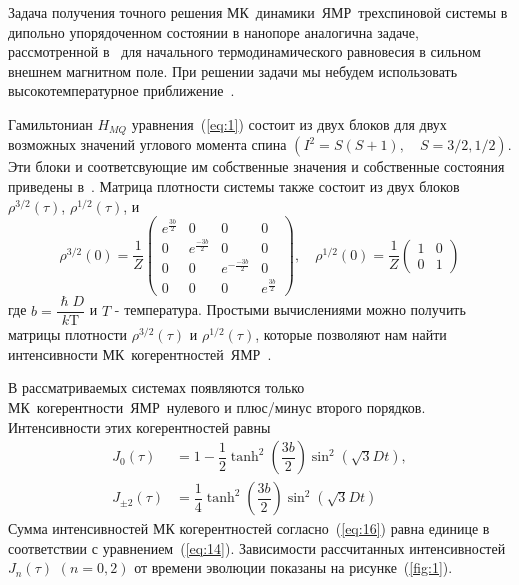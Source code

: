 \documentclass[utf8]{jetp}
\begin{document}
Задача получения точного решения МК~динамики~ЯМР~трехспиновой системы в дипольно упорядоченном состоянии в нанопоре аналогична задаче, рассмотренной в~\cite{Doronin_2019} для начального термодинамического равновесия в сильном внешнем магнитном поле.
При решении задачи мы небудем  использовать высокотемпературное приближение~\cite{Goldman_1970}.

Гамильтониан $H_{MQ}$ уравнения~(\ref{eq:1}) состоит из двух блоков для двух возможных значений углового момента спина $(I^2 = S(S+1), \quad S=3/2,1/2)$.
Эти блоки и соответсвующие им собственные значения и собственные состояния приведены в~\cite{Doronin_2019}.
Матрица плотности системы также состоит из двух блоков $\rho^{3/2}(\tau)$, $\rho^{1/2}(\tau)$, и
%
\begin{equation}
  \label{eq:15}
  \rho^{3/2}(0) = \dfrac 1 Z
  \begin{pmatrix}
    e^{\frac{3b}{2}} & 0 & 0 & 0
    \\
    0 & e^{\frac{-3b}{2}} & 0 & 0
    \\
    0 & 0 & e^{-\frac{-3b}{2}} & 0
    \\
    0 & 0 & 0 & e^{\frac{3b}{2}}
  \end{pmatrix},
  \quad
  \rho^{1/2}(0) = \dfrac 1 Z
  \begin{pmatrix}
    	1 & 0
    \\
    0 & 1
  \end{pmatrix}
\end{equation}
%
где $b = \dfrac{\hslash D}{k\mathrm{T}}$ и $T$ - температура.
Простыми вычислениями можно получить матрицы плотности $\rho^{3/2}(\tau)$ и $\rho^{1/2}(\tau)$,
которые позволяют нам найти интенсивности МК~когерентностей~ЯМР~.

В рассматриваемых системах появляются только МК~когерентности~ЯМР~нулевого и плюс/минус второго порядков.
Интенсивности этих когерентностей равны
%
\begin{equation}
  \begin{split}
    \label{eq:16}
    J_0(\tau) & = 1
    - \dfrac 1 2 \tanh^2\left( \dfrac{3b}{2} \right)
      \sin^2 \left( \sqrt{3} Dt \right),
    \\
    J_{\pm2}(\tau) & = \dfrac{1}{4}
      \tanh^2 \left( \dfrac{3b}{2} \right)
      \sin^2 \left( \sqrt{3} Dt \right)
  \end{split}
\end{equation}
%
Сумма интенсивностей МК когерентностей согласно~(\ref{eq:16}) равна единице в соответствии с уравнением~(\ref{eq:14}).
Зависимости рассчитанных интенсивностей $J_{n}(\tau)$ $(n=0,2)$ от времени эволюции показаны на рисунке~(\ref{fig:1}).
\end{document}
